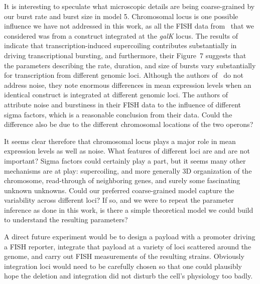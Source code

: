 It is interesting to speculate what microscopic details are being
coarse-grained by our burst rate and burst size in model 5.
Chromosomal locus is one possible influence we have not addressed
in this work, as all the FISH data from~\cite{Jones2014} that we
considered was from a construct integrated at the \textit{galK} locus.
The results of~\cite{Chong2014} indicate that
transcription-induced supercoiling contributes substantially in
driving transcriptional bursting, and furthermore, their Figure~7
suggests that the parameters describing the rate, duration, and
size of bursts vary substantially for transcription from
different genomic loci.
Although the authors of~\cite{Englaender2017} do not address
noise, they note enormous differences in mean expression levels
when an identical construct is integrated at different genomic loci.
The authors of~\cite{Engl2020} attribute noise and burstiness in
their FISH data to the influence of different sigma factors,
which is a reasonable conclusion from their data.
Could the difference also be due to the different chromosomal
locations of the two operons?

It seems clear therefore that chromosomal locus plays a major
role in mean expression levels as well as noise. What features of
different loci are and are not important? Sigma factors could
certainly play a part, but it seems many other mechanisms are at
play: supercoiling, and more generally 3D organization of the
chromosome, read-through of neighboring genes, and surely some
fascinating unknown unknowns.
Could our preferred coarse-grained model capture the variability
across different loci? If so, and we were to repeat the parameter
inference as done in this work, is there a simple theoretical model
we could build to understand the resulting parameters?

A direct  future experiment would be
to design a payload with a promoter driving a FISH reporter,
integrate that payload at a variety of loci scattered around the genome,
and carry out FISH measurements of the resulting strains.
Obviously integration loci would need to be carefully chosen so
that one could plausibly hope the deletion and integration did
not disturb the cell's physiology too badly.
